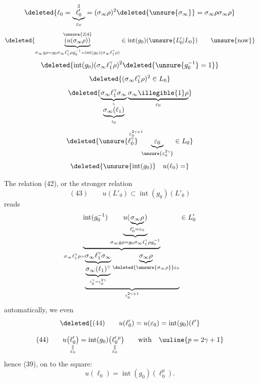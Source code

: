 \[
\deleted{\ell_0=\underbrace{\ell'_0}_{\varepsilon_0}^{2}=(\sigma_\infty\rho)^2\deleted{\unsure{\sigma_\infty}}=\sigma_\infty\rho\sigma_\infty\rho}
\]
\[
\deleted{\underbrace{(u(\sigma_\infty\rho))}_{
\substack{\sigma_\infty g\rho=g_0\sigma_\infty \ell_1^\gamma\rho g_0^{-1}
=\operatorname{int}(g_0)(\sigma_\infty \ell_1^\gamma\rho)}}^{\unsure{2|4}}
\in\operatorname{int}(g_0)(\unsure{L'_0|L_0})\qquad\text{\unsure{now}}}
\]
\[
\deleted{\operatorname{int}(g_0)(\sigma_\infty \ell_1^\gamma\rho)^2\deleted{\unsure{g_0^{-1}}=1}}
\]
\[
\deleted{(\sigma_\infty \ell_1^\gamma\rho)^2\in L_0}
\]
\[
\deleted{
\underbrace{\sigma_\infty \ell_1^\gamma\sigma_\infty}_{
    \underbrace{\sigma_\infty(\ell_1)}_{\ell_0}^{\gamma}}
  \underbrace{\sigma_\infty\illegible{1}\rho}_{\varepsilon_0}
}
\]
\[
\deleted{\overset{\varepsilon_0^{2\gamma+1}}{\unsure{\ell_0^\gamma}\ \underbrace{\varepsilon_0}_{\unsure{\varepsilon_0^{2\gamma}}}}\in L_0}
\]
\[
\deleted{\unsure{\operatorname{int}(g_0)}\quad u(\ell_0)=}
\]

The relation (42), or the  stronger relation
\[
(43)\qquad u(L'_0)\subset\operatorname{int}(g_0)(L'_0)
\]
reads
\[
\underbrace{\operatorname{int}(g_0^{-1})\,
\underbrace{u(\underbrace{\sigma_\infty\rho}_{\ell'_0=\varepsilon_0})}_{
\sigma_\infty g\rho=g_0\sigma_\infty \ell_1^\gamma\rho g_0^{-1}}}_{
\sigma_\infty \ell_1^\gamma\rho
=\underbrace{\underbrace{\sigma_\infty \ell_1^\gamma\sigma_\infty}_{
 \underbrace{\sigma_\infty(\ell_1)^\gamma}_{\ell_0^\gamma=\varepsilon_0^{2\gamma}}}
\underbrace{\sigma_\infty\rho}_{\deleted{\unsure{\sigma_\infty\rho}}\varepsilon_0}}_{
\varepsilon_0^{2\gamma+1}}}
\in L'_0
\]
 automatically, we 
even
\[
\deleted{(44)\qquad u(\ell'_0)=u(\varepsilon_0)
=\operatorname{int}(g_0)(\ell'}
\]


\[
(44)\qquad
u\bigl(\underset{\substack{\Vert\\ \varepsilon_0}}{\ell'_0}\bigr)
 = \operatorname{int}(g_0)\bigl(\underset{\substack{\Vert\\ \varepsilon_0}}{\ell'_0}{}^{p}\bigr)
\qquad \text{with}\quad \uuline{p=2\gamma+1}
\]
hence (39),  on  to the square:
\[
u(\ell_0)=\operatorname{int}(g_0)(\ell_0^p).
\]


